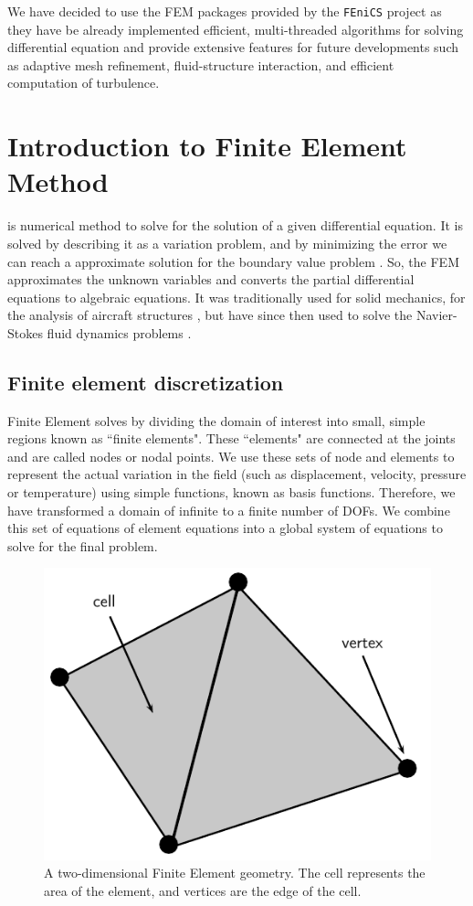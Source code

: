 We have decided to use the FEM packages provided by the \texttt{FEniCS} project as they have be already implemented efficient, multi-threaded algorithms for solving differential equation and provide extensive features for future developments such as adaptive mesh refinement, fluid-structure interaction, and efficient computation of turbulence.

\section{Introduction to Finite Element Method}

 is numerical method to solve for the solution of a given differential equation. It is solved by describing it as a variation problem, and by minimizing the error we can reach a approximate solution for the boundary value problem \cite{Brenner2008}. So, the FEM approximates the unknown variables and converts the partial differential equations to algebraic equations. It was traditionally used for solid mechanics, for the analysis of aircraft structures \cite{Rao2005}, but have since then used to solve the Navier-Stokes fluid dynamics problems \cite{Guermond2006} \cite{Johnston2004} \cite{Guermond2003}.

\subsection*{Finite element discretization}

Finite Element solves by dividing the domain of interest into small, simple regions known as ``finite elements". These ``elements" are connected at the joints and are called nodes or nodal points. We use these sets of node and elements to represent the actual variation in the field (such as displacement, velocity, pressure or temperature) using simple functions, known as basis functions. Therefore, we have transformed a domain of infinite  to a finite number of DOFs. We combine this set of equations of element equations into a global system of equations to solve for the final problem.

	\begin{figure}[b]
	\centering
	\includegraphics[width=0.4\linewidth]{./figures/eulerian/finiteElementDefinitions.pdf}
	\caption{A two-dimensional Finite Element geometry. The cell represents the area of the element, and vertices are the edge of the cell.}
	\label{fig:finiteElementDefinitions}
	\end{figure}

